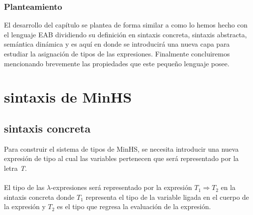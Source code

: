 \subsubsection{Planteamiento}
El desarrollo del capítulo se plantea de forma similar a como lo hemos hecho con el lenguaje \textsf{EAB} dividiendo su definición en sintaxis concreta, sintaxis abstracta, semántica dinámica y es aquí en donde se introducirá una nueva capa para estudiar la asignación de tipos de las expresiones. Finalmente concluiremos mencionando brevemente las propiedades que este pequeño lenguaje posee. \\

\section{sintaxis de \textsf{MinHS}}

\subsection{sintaxis concreta}
    Para construir el sistema de tipos de \textsf{MinHS}, se necesita introducir una nueva expresión de tipo al cual las variables pertenecen que será representado por la letra \textit{T}.\\\\    
     El tipo de las $\lambda$-expresiones  será representado por la expresión $T_1 \Rightarrow T_2$ en la sintaxis concreta donde $T_1$ representa el tipo de la variable ligada en el cuerpo de la expresión  y $T_2$ es el tipo que regresa la evaluación de la expresión. 

\bigskip

